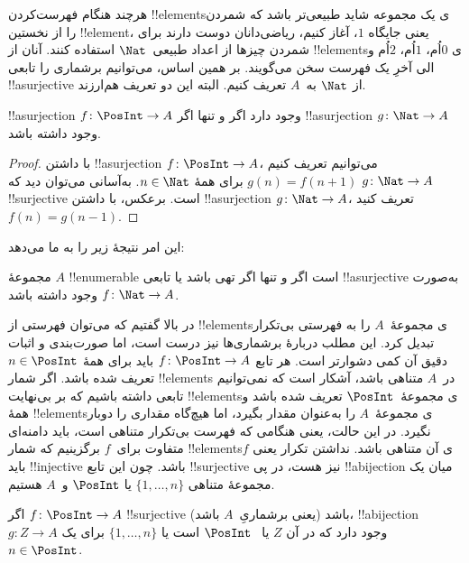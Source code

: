 \documentclass[../../../include/open-logic-section]{subfiles}
\begin{document}
هرچند هنگام فهرست‌کردن !!{element}sی یک مجموعه شاید طبیعی‌تر باشد که
شمردن را از نخستین !!{element}، یعنی جایگاه $1$، آغاز کنیم، ریاضی‌دانان
دوست دارند برای شمردن چیزها از اعداد طبیعی~$\Nat$ استفاده کنند. آنان از
!!{element}sی $0$اُم، $1$اُم، $2$اُم و الی آخرِ یک فهرست سخن
می‌گویند. بر همین اساس، می‌توانیم برشماری را تابعی !!a{surjective} از
$\Nat$ به~$A$ تعریف کنیم. البته این دو تعریف هم‌ارزند.

\begin{prop}
  !!a{surjection} $f\colon \PosInt \to A$ وجود دارد اگر و تنها اگر
  !!a{surjection} $g\colon \Nat \to A$ وجود داشته باشد.
\end{prop}

\begin{proof}
  با داشتن !!a{surjection} $f\colon \PosInt \to A$، می‌توانیم تعریف کنیم
  $g(n) =
  f(n+1)$ برای همهٔ $n \in \Nat$. به‌آسانی می‌توان دید که $g\colon \Nat
  \to A$ !!{surjective} است. برعکس، با داشتن !!a{surjection} $g\colon
  \Nat \to A$، تعریف کنید $f(n) = g(n-1)$.
\end{proof}

این امر نتیجهٔ زیر را به ما می‌دهد:

\begin{cor}
مجموعهٔ $A$ !!{enumerable} است اگر و تنها اگر تهی باشد یا تابعی
!!a{surjective} به‌صورت $f\colon \Nat \to A$ وجود داشته باشد.
\end{cor}

در بالا گفتیم که می‌توان فهرستی از !!{element}sی مجموعهٔ~$A$ را به
فهرستی بی‌تکرار تبدیل کرد. این مطلب دربارهٔ برشماری‌ها نیز درست است،
اما صورت‌بندی و اثبات دقیق آن کمی دشوارتر است. هر تابع $f\colon \PosInt \to A$
باید برای همهٔ $n \in
\PosInt$ تعریف شده باشد. اگر شمار !!{element}s در~$A$ متناهی باشد،
آشکار است که نمی‌توانیم تابعی داشته باشیم که بر بی‌نهایت !!{element}sی
مجموعهٔ~$\PosInt$ تعریف شده باشد و همهٔ
!!{element}sی مجموعهٔ~$A$ را به‌عنوان مقدار بگیرد، اما هیچ‌گاه مقداری را
دوبار نگیرد. در این حالت، یعنی هنگامی که فهرست بی‌تکرار متناهی است، باید
دامنه‌ای متفاوت برای~$f$ برگزینیم که شمار !!{element}sی آن متناهی باشد.
نداشتن تکرار یعنی $f$ باید !!{injective} باشد. چون این تابع
!!{surjective} نیز هست، در پی !!a{bijection} میان یک مجموعهٔ متناهی
$\{1, \dots, n\}$ یا $\PosInt$ و~$A$ هستیم.

\begin{prop}
اگر $f\colon \PosInt \to A$ !!{surjective} باشد (یعنی برشماریِ~$A$
باشد)، !!a{bijection} $g\colon Z \to A$ وجود دارد که در آن $Z$ یا
~$\PosInt$ است یا $\{1, \dots, n\}$ برای یک~$n \in \PosInt$.
\end{prop}
\end{document}
